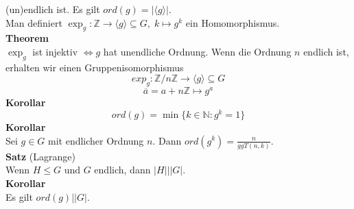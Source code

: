 \documentclass[a4paper, 12pt]{article}
\begin{document}
(un)endlich ist. Es gilt $ord(g) = \left|\langle g \rangle \right|$.\\
Man definiert $\exp_g: \mathbb{Z} \to \langle g \rangle \subseteq G, \; k \mapsto g^k$ ein Homomorphismus.\\
\textbf{Theorem}\\
$\exp_g$ ist injektiv $\Leftrightarrow g$ hat unendliche Ordnung. Wenn die Ordnung $n$ endlich ist, erhalten wir einen Gruppenisomorphismus \[exp_g: \mathbb{Z}/ n\mathbb{Z} \to \langle g\rangle \subseteq G\]\[\overline{a} = a+n\mathbb{Z} \mapsto g^a\]
\textbf{Korollar}
\[ord(g) = \min\{k \in \mathbb{N}: g^k = 1\}\]
\textbf{Korollar}\\
Sei $g \in G$ mit endlicher Ordnung $n$. Dann $ord(g^k) = \frac{n}{ggT(n,k)}$.\\
\textbf{Satz} (Lagrange)\\
Wenn $H\leq G$ und $G$ endlich, dann $\left|H\right| | \left| G \right|$.\\
\textbf{Korollar}\\
Es gilt $ord(g) | \left|G\right|$.
\end{document}
